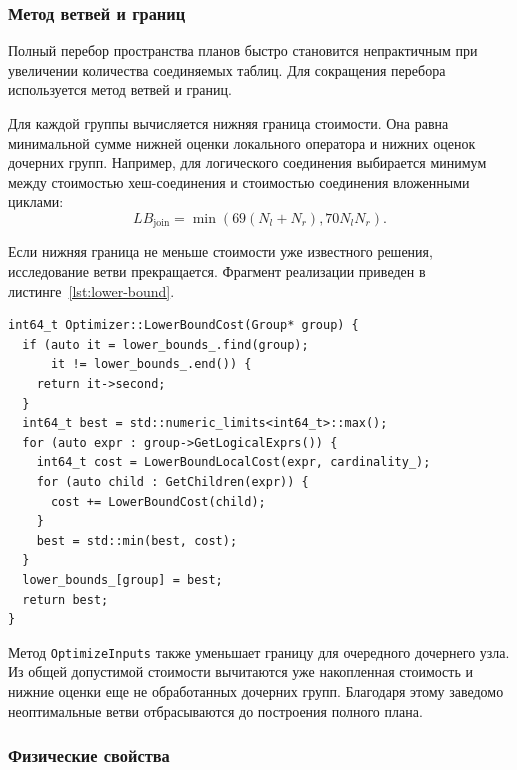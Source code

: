 \documentclass[14pt, russian]{scrartcl}
\begin{document}
\subsubsection{Метод ветвей и границ}

Полный перебор пространства планов быстро становится непрактичным при
увеличении количества соединяемых таблиц. Для сокращения перебора используется
метод ветвей и границ.

Для каждой группы вычисляется нижняя граница стоимости. Она равна минимальной
сумме нижней оценки локального оператора и нижних оценок дочерних групп.
Например, для логического соединения выбирается минимум между стоимостью
хеш-соединения и стоимостью соединения вложенными циклами:
\[
  LB_{\text{join}} =
  \min(69(N_l + N_r), 70N_lN_r).
\]

\noindent{}Если нижняя граница не меньше стоимости уже известного решения,
исследование ветви прекращается. Фрагмент реализации приведен в
листинге~\ref{lst:lower-bound}.

\begin{listing}[H]
  \caption{Вычисление нижней границы стоимости группы.}
  \label{lst:lower-bound}
  \begin{verbatim}
int64_t Optimizer::LowerBoundCost(Group* group) {
  if (auto it = lower_bounds_.find(group);
      it != lower_bounds_.end()) {
    return it->second;
  }
  int64_t best = std::numeric_limits<int64_t>::max();
  for (auto expr : group->GetLogicalExprs()) {
    int64_t cost = LowerBoundLocalCost(expr, cardinality_);
    for (auto child : GetChildren(expr)) {
      cost += LowerBoundCost(child);
    }
    best = std::min(best, cost);
  }
  lower_bounds_[group] = best;
  return best;
}
  \end{verbatim}
\end{listing}

Метод \verb|OptimizeInputs| также уменьшает границу для очередного дочернего
узла. Из общей допустимой стоимости вычитаются уже накопленная стоимость и
нижние оценки еще не обработанных дочерних групп. Благодаря этому заведомо
неоптимальные ветви отбрасываются до построения полного плана.


\subsubsection{Физические свойства}
\end{document}
